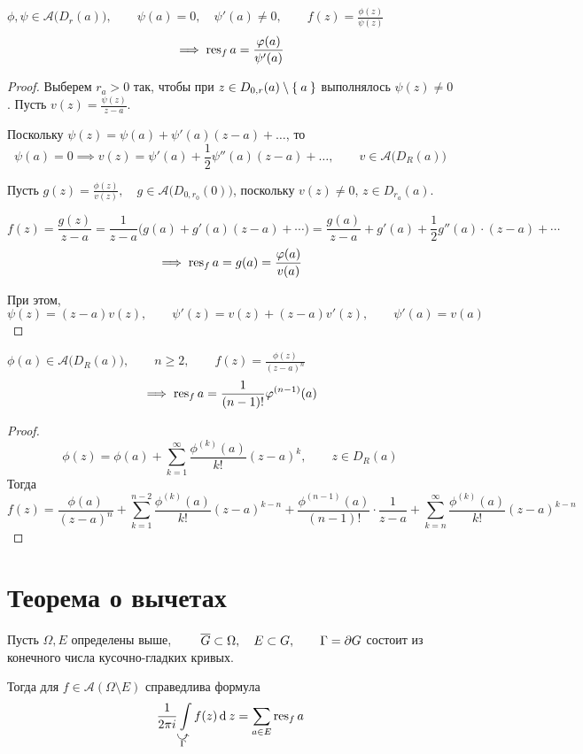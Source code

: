 \begin{statement}
	$ \phi, \psi \in \mathcal A \big( D_r(a) \big), \qquad \psi(a) = 0, \quad \psi'(a) \ne 0, \qquad f(z) = \frac{\phi(z)}{\psi(z)} $
	$$ \implies \operatorname{res}_f a = \frac{\varphi(a)}{\psi'(a)} $$
\end{statement}

\begin{proof}
	Выберем $ r_a > 0 $ так, чтобы при $ z \in D_{0, r}(a) \setminus \Set{a} $ выполнялось $ \psi(z) \ne 0 $. Пусть $ v(z) = \frac{\psi(z)}{z - a} $.

	Поскольку $ \psi(z) = \psi(a) + \psi'(a) (z - a) + \dots $, то
	$$ \psi(a) = 0 \implies v(z) = \psi'(a) + \frac12 \psi''(a)(z - a) + \dots, \qquad v \in \mathcal A \big( D_R(a) \big) $$

	Пусть $ g(z) = \frac{\phi(z)}{v(z)}, \quad g \in \mathcal A \big( D_{0, r_0}(0) \big) $, поскольку $ v(z) \ne 0 $, $ z \in D_{r_a}(a) $.

	$$ f(z) = \frac{g(z)}{z - a} = \frac1{z - a} \big( g(a) + g'(a)(z - a) + \cdots) = \frac{g(a)}{z - a} + g'(a) + \frac12g''(a) \cdot (z - a) + \cdots $$
	$$ \implies \operatorname{res}_f a = g(a) = \frac{\varphi(a)}{v(a)} $$

	При этом,
	$$ \psi(z) = (z - a)v(z), \qquad \psi'(z) = v(z) + (z - a)v'(z), \qquad \psi'(a) = v(a) $$
\end{proof}

\begin{statement}\label{stmt:residues:2}
	$ \phi(a) \in \mathcal A \big( D_R(a) \big), \qquad n \ge 2, \qquad f(z) = \frac{\phi(z)}{(z - a)^n} $
	$$ \implies \operatorname{res}_f a = \frac1{(n - 1)!}\varphi^{(n - 1)}(a) $$
\end{statement}

\begin{proof}
	$$ \phi(z) = \phi(a) + \sum_{k = 1}^\infty \frac{\phi^{(k)}(a)}{k!}(z - a)^k, \qquad z \in D_R(a) $$
	Тогда
	$$ f(z) = \frac{\phi(a)}{(z - a)^n} + \sum_{k = 1}^{n - 2} \frac{\phi^{(k)}(a)}{k!}(z - a)^{k - n} + \frac{\phi^{(n - 1)}(a)}{(n - 1)!} \cdot \frac1{z - a} + \sum_{k = n}^\infty \frac{\phi^{(k)}(a)}{k!}(z - a)^{k - n} $$
\end{proof}

\section{Теорема о вычетах}

\begin{theorem}
	Пусть $ \Omega, E $ определены выше, $ \qquad \overline G \subset \Omega, \quad E \subset G, \qquad \Gamma = \partial G $ состоит из конечного числа кусочно-гладких кривых.

	Тогда для $ f \in \mathcal A (\Omega \setminus E) $ справедлива формула
	$$ \frac1{2\pi i} \int\limits_{\curvedir \Gamma} f(z) \di z = \sum_{a \in E} \res_f a $$
\end{theorem}

